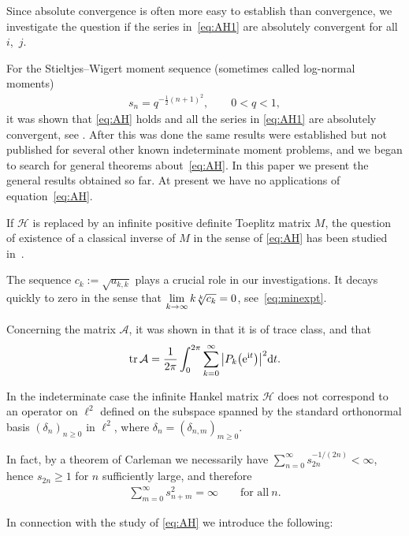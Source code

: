 \documentclass[pdftex]{sigma}
\DeclareMathOperator{\tr}{tr}
\numberwithin{equation}{section}
\begin{document}
Since absolute convergence is often more easy to establish than convergence, we investigate the question if the series in~\eqref{eq:AH1} are absolutely convergent for all~$i$,~$j$.

For the Stieltjes--Wigert moment sequence (sometimes called log-normal moments)
\begin{gather*}
s_n=q^{-\tfrac12 (n+1)^2},\qquad 0<q<1,
\end{gather*}
 it was shown that \eqref{eq:AH} holds and all the series in \eqref{eq:AH1} are absolutely convergent, see \cite[Section~5]{B:S1}. After this was done the same results were established but not published for several other known indeterminate moment problems, and we began to search for general theorems about~\eqref{eq:AH}. In this paper we present the general results obtained so far. At present we have no applications of equation~\eqref{eq:AH}.

If $\mathcal H$ is replaced by an infinite positive definite Toeplitz matrix $M$, the question of existence of a classical inverse of $M$ in the sense of \eqref{eq:AH} has been studied in~\cite{E:G:T}.

The sequence $c_k:=\sqrt{a_{k,k}}$ plays a crucial role in our investigations. It decays quickly to zero in the sense that $\lim\limits_{k\to\infty} k\root{k}\of{c_{k}}=0$, see~\eqref{eq:minexpt}.

Concerning the matrix $\mathcal A$, it was shown in \cite[Section~4]{B:S1} that it is of trace class, and that
\begin{gather*}
\tr\mathcal A=\frac{1}{2\pi}\int_0^{2\pi} \sum_{k=0}^\infty \big|P_k\big({\rm e}^{{\rm i}t}\big)\big|^2{\rm d}t.
\end{gather*}

In the indeterminate case the infinite Hankel matrix $\mathcal H$ does not correspond to an operator on $\ell^2$ defined on the subspace spanned by the standard orthonormal basis $(\delta_n)_{n\ge 0}$ in $\ell^2$, where $\delta_n=(\delta_{n,m})_{m\ge 0}$.

In fact, by a theorem of Carleman we necessarily have $\sum\limits_{n=0}^\infty s_{2n}^{-1/(2n)}<\infty$, hence $s_{2n}\ge 1$ for $n$ sufficiently large, and therefore
\begin{gather*}
\sum_{m=0}^\infty s_{n+m}^2=\infty\qquad \mbox{for all} \ n.
\end{gather*}

In connection with the study of \eqref{eq:AH} we introduce the following:
\end{document}
